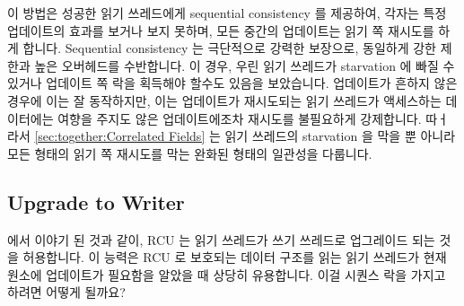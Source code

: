이 방법은 성공한 읽기 쓰레드에게 sequential consistency 를 제공하여, 각자는
특정 업데이트의 효과를 보거나 보지 못하며, 모든 중간의 업데이트는 읽기 쪽
재시도를 하게 합니다.
Sequential consistency 는 극단적으로 강력한 보장으로, 동일하게 강한 제한과 높은
오버헤드를 수반합니다.
이 경우, 우린 읽기 쓰레드가 starvation 에 빠질 수 있거나 업데이트 쪽 락을
획득해야 할수도 있음을 보았습니다.
업데이트가 흔하지 않은 경우에 이는 잘 동작하지만, 이는 업데이트가 재시도되는
읽기 쓰레드가 액세스하는 데이터에는 여향을 주지도 않은 업데이트에조차 재시도를
불필요하게 강제합니다.
따ㅓ라서 \cref{sec:together:Correlated Fields} 는 읽기 쓰레드의 starvation 을
막을 뿐 아니라 모든 형태의 읽기 쪽 재시도를 막는 완화된 형태의 일관성을
다룹니다.

\iffalse

Another approach is to shard the data elements, and then have each update
write-acquire all the sequence locks needed to cover the data elements
affected by that update.
Of course, these write acquisitions must be done carefully in order to
avoid deadlock.
Readers would also need to read-acquire multiple sequence locks, but
in the surprisingly common case where readers only look up one data
element, only one sequence lock need be read-acquired.

This approach provides sequential consistency to successful readers,
each of which will either see the effects of a given update or not,
with any partial updates resulting in a read-side retry.
Sequential consistency is an extremely strong guarantee, incurring equally
strong restrictions and equally high overheads.
In this case, we saw that readers might be starved on the one hand, or
might need to acquire the update-side lock on the other.
Although this works very well in cases where updates are infrequent,
it unnecessarily forces read-side retries even when the update does not
affect any of the data that a retried reader accesses.
\Cref{sec:together:Correlated Fields} therefore covers a much weaker form
of consistency that not only avoids reader starvation, but also avoids
any form of read-side retry.

\fi

\subsection{Upgrade to Writer}
\label{sec:together:Upgrade to Writer}

 에서 이야기 된 것과
같이, RCU 는 읽기 쓰레드가 쓰기 쓰레드로 업그레이드 되는 것을 허용합니다.
이 능력은 RCU 로 보호되는 데이터 구조를 읽는 읽기 쓰레드가 현재 원소에
업데이트가 필요함을 알았을 때 상당히 유용합니다.
이걸 시퀀스 락을 가지고 하려면 어떻게 될까요?


